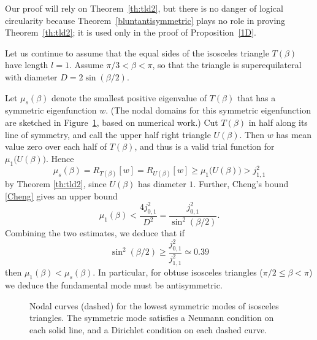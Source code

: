 \documentclass[11pt,reqno]{amsart}
\numberwithin{equation}{section}
\begin{document}
Our proof will rely on Theorem~\ref{th:tld2}, but there is no
danger of logical circularity because
Theorem~\ref{bluntantisymmetric} plays no role in proving Theorem~\ref{th:tld2}; it is used only in the proof of Proposition~\ref{1D}.

Let us continue to assume that the equal sides of the isosceles triangle
$T(\beta)$ have length $l=1$. Assume $\pi/3 < \beta < \pi$, so that the triangle is superequilateral with diameter $D=2\sin(\beta/2)$.

Let $\mu_s(\beta)$ denote the smallest positive eigenvalue of $T(\beta)$
that has a symmetric eigenfunction $w$. (The nodal domains for this symmetric eigenfunction are sketched in Figure~\ref{fig:symmmode}, based on numerical work.) Cut $T(\beta)$ in half along its line of symmetry, and call the upper half right triangle $U(\beta)$. Then $w$ has mean value zero over each half of $T(\beta)$, and thus is a valid trial function for $\mu_1 \big( U(\beta) \big)$. Hence
\[
\mu_s(\beta) = R_{T(\beta)}[w] = R_{U(\beta)}[w] \geq \mu_1 \big( U(\beta) \big) > j_{1,1}^2
\]
by Theorem \ref{th:tld2}, since $U(\beta)$ has diameter $1$. Further, Cheng's bound \eqref{Cheng} gives an upper bound
\[
  \mu_1(\beta)<\frac{4j_{0,1}^2}{D^2} = \frac{j_{0,1}^2}{\sin^2(\beta/2)}.
\]
Combining the two estimates, we deduce that if
\[
\sin^2(\beta/2) \geq \frac{j_{0,1}^2}{j_{1,1}^2} \simeq 0.39
\]
then $\mu_1(\beta)<\mu_s(\beta)$. In particular, for obtuse isosceles triangles ($\pi/2 \leq \beta < \pi$) we deduce the fundamental mode must be antisymmetric. 

\begin{figure}[t]
    \hspace{\fill}
    \hspace{\fill}
    \hspace{\fill}
    \hspace{\fill}
  \caption{Nodal curves (dashed) for the lowest symmetric modes of isosceles triangles. The symmetric mode satisfies a Neumann condition on each solid line, and a Dirichlet condition on each dashed curve.}
\label{fig:symmmode}
\end{figure}
\end{document}
